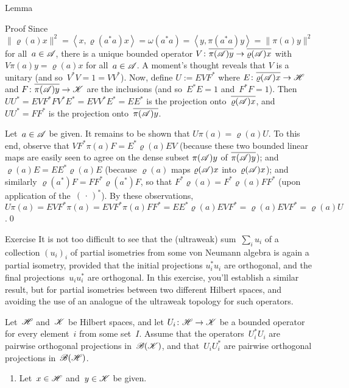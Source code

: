 \documentclass[a]{subfiles}
\begin{document}
\begin{parsec}
\begin{point}{Lemma}
\begin{point}{Proof}
Since $\|\varrho(a)x\|^2
= \left<x,\varrho(a^*a)x\right>
=\omega(a^*a)=\left<y,\pi(a^*a)y\right>
= \|\pi(a)y\|^2$ for all~$a\in\mathscr{A}$,
there is a unique bounded operator $V\colon \overline{\pi(\mathscr{A})y}
\to \overline{\varrho(\mathscr{A})x}$
with $V\pi(a)y = \varrho(a)x$ for all~$a\in\mathscr{A}$.
A moment's thought reveals
that $V$ is a unitary (and so~$V^*V=1=VV^*$).
Now, define $U:=EVF^*$
where $E\colon \overline{\varrho(\mathscr{A})x}\to\mathscr{H}$
and $F\colon \overline{\pi(\mathscr{A})y}\to\mathscr{K}$
are the inclusions
(and so~$E^*E=1$ and~$F^*F=1$).
Then $UU^*= EVF^*FV^*E^*=EVV^*E^*=EE^*$
is the projection onto~$\overline{\varrho(\mathscr{A})x}$,
and $UU^*=FF^*$
is the projection onto~$\overline{\pi(\mathscr{A})y}$.

Let~$a\in\mathscr{A}$ be given.
It remains to be shown that
$U\pi(a)=\varrho(a)U$.
To this end,
observe that
$V F^* \pi(a) F = E^* \varrho(a) E V$
(because 
these two bounded linear maps
are easily seen to
agree on the dense subset $\pi(\mathscr{A})y$
of $\overline{\pi(\mathscr{A})y}$);
and $\varrho(a)E = EE^*\varrho(a)E$
(because $\varrho(a)$ maps $\varrho(\mathscr{A})x$ into~$\varrho(\mathscr{A})x$);
and similarly $\varrho(a^*)F=FF^*\varrho(a^*) F$,
so that $F^*\varrho(a) = F^* \varrho(a) FF^*$
(upon application of the~$(\,\cdot\,)^*$).
By these observations,  $U\pi(a)=
EVF^*\pi(a)=EVF^*\pi(a) FF^*
= EE^*\varrho(a)EVF^*
= \varrho(a)EVF^*
= \varrho(a)U$.\qed
\end{point}
\end{point}
\begin{point}{Exercise}%
It is not too difficult 
to see that the (ultraweak) sum~$\sum_i u_i$
of a collection $(u_i)_i$ 
of partial isometries from some von Neumann algebra
is again a partial isometry, 
provided that the initial projections $u_i^*u_i$
are orthogonal,
and the final projections~$u_iu_i^*$ are orthogonal.
In this exercise, you'll establish a similar result,
but for partial isometries between two different Hilbert spaces,
and avoiding the use of an analogue of 
the ultraweak topology for such operators.

\begin{point}%
Let~$\mathscr{H}$ and~$\mathscr{K}$ be Hilbert spaces,
and 
let $U_i\colon \mathscr{H}\to\mathscr{K}$
be a bounded operator
for every element~$i$ from some set~$I$.
Assume that the operators~$U_i^*U_i$
are pairwise orthogonal projections in~$\mathscr{B}(\mathscr{K})$,
and that~$U_iU_i^*$ are pairwise orthogonal projections in~$\mathscr{B}(\mathscr{H})$.
\begin{enumerate}
\item
Let~$x\in\mathscr{H}$ and~$y\in\mathscr{K}$ be given.


\end{enumerate}
\end{point}
\end{point}
\end{parsec}
\end{document}
